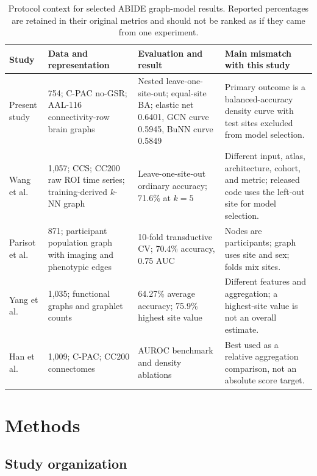 \documentclass[11pt,a4paper]{article}
\begin{document}
\begin{table}[htbp]
\centering
\caption{Protocol context for selected ABIDE graph-model results. Reported
percentages are retained in their original metrics and should not be ranked
as if they came from one experiment.}
\label{tab:literature-context}
\footnotesize
\begin{tabularx}{\textwidth}{@{}p{2.4cm}p{3.0cm}p{3.1cm}Y@{}}
\toprule
\textbf{Study} & \textbf{Data and representation} & \textbf{Evaluation and result} & \textbf{Main mismatch with this study} \\
\midrule
Present study & 754; C-PAC no-GSR; AAL-116 connectivity-row brain graphs & Nested leave-one-site-out; equal-site BA; elastic net 0.6401, GCN curve 0.5945, BuNN curve 0.5849 & Primary outcome is a balanced-accuracy density curve with test sites excluded from model selection. \\
Wang et al. \cite{wang2021cgcn} & 1,057; CCS; CC200 raw ROI time series; training-derived $k$-NN graph & Leave-one-site-out ordinary accuracy; 71.6\% at $k=5$ & Different input, atlas, architecture, cohort, and metric; released code uses the left-out site for model selection. \\
Parisot et al. \cite{parisot2018disease} & 871; participant population graph with imaging and phenotypic edges & 10-fold transductive CV; 70.4\% accuracy, 0.75 AUC & Nodes are participants; graph uses site and sex; folds mix sites. \\
Yang et al. \cite{yang2022graphletgcn} & 1,035; functional graphs and graphlet counts & 64.27\% average accuracy; 75.9\% highest site value & Different features and aggregation; a highest-site value is not an overall estimate. \\
Han et al. \cite{han2026rethinking} & 1,009; C-PAC; CC200 connectomes & AUROC benchmark and density ablations & Best used as a relative aggregation comparison, not an absolute score target. \\
\bottomrule
\end{tabularx}
\end{table}

\section{Methods}

\subsection{Study organization}
\end{document}
